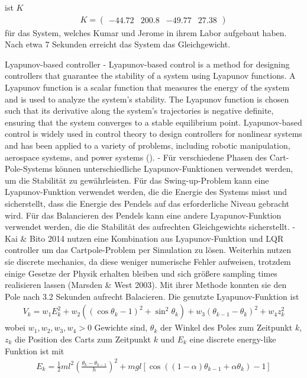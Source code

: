 ist $K$
\begin{align}
    K = \begin{pmatrix}
        -44.72 & 200.8 & -49.77 & 27.38
    \end{pmatrix}
\end{align}
für das System, welches Kumar und Jerome in ihrem Labor aufgebaut haben. Nach etwa 7 Sekunden erreicht das System das Gleichgewicht.

Lyapunov-based controller
- Lyapunov-based control is a method for designing controllers that guarantee the stability of a system using Lyapunov functions. A Lyapunov function is a scalar function that measures the energy of the system and is used to analyze the system's stability. The Lyapunov function is chosen such that its derivative along the system's trajectories is negative definite, ensuring that the system converges to a stable equilibrium point. Lyapunov-based control is widely used in control theory to design controllers for nonlinear systems and has been applied to a variety of problems, including robotic manipulation, aerospace systems, and power systems (\cite{slotine_applied_1991}).
- Für verschiedene Phasen des Cart-Pole-Systems können unterschiedliche Lyapunov-Funktionen verwendet werden, um die Stabilität zu gewährleisten. Für das Swing-up-Problem kann eine Lyapunov-Funktion verwendet werden, die die Energie des Systems misst und sicherstellt, dass die Energie des Pendels auf das erforderliche Niveau gebracht wird. Für das Balancieren des Pendels kann eine andere Lyapunov-Funktion verwendet werden, die die Stabilität des aufrechten Gleichgewichts sicherstellt.
- Kai & Bito 2014 nutzen eine Kombination aus Lyapunov-Funktion und LQR controller um das Cartpole-Problem per Simulation zu lösen. Weiterhin nutzen sie discrete mechanics, da diese weniger numerische Fehler aufweisen, trotzdem einige Gesetze der Physik erhalten bleiben und sich größere sampling times realisieren lassen (Marsden & West 2003). Mit ihrer Methode konnten sie den Pole nach 3.2 Sekunden aufrecht Balacieren. Die genutzte Lyapunov-Funktion ist
\begin{align}
    V_k = w_1E_k^2 + w_2\left((\cos\theta_k-1)^2 + \sin^2\theta_k\right) + w_3(\theta_{k-1} - \theta_k)^2 + w_4z_k^2
\end{align}
wobei $w_1, w_2, w_3, w_4>0$ Gewichte sind, $\theta_k$ der Winkel des Poles zum Zeitpunkt $k$, $z_k$ die Position des Carts zum Zeitpunkt $k$ und $E_k$ eine discrete energy-like Funktion ist mit
\begin{align}
    E_k = \frac{1}{2}ml^2\left(\frac{\theta_k - \theta_{k-1}}{h}\right)^2 + mgl[\cos((1-\alpha)\theta_{k-1} + \alpha\theta_k) - 1]
\end{align}
